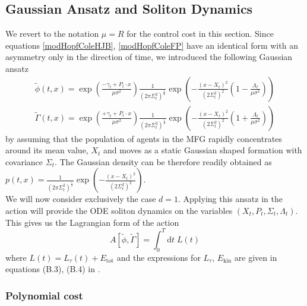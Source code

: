 \documentclass[letterpaper, 12pt]{article}
\newcommand{\rd}{{\mathrm d}}
\newcommand{\tilGamma}{\tilde{\Gamma}}
\newcommand{\tilphi}{\tilde{\phi}}
\begin{document}
\subsection{Gaussian Ansatz and Soliton Dynamics}

We revert to the notation $\mu = R$ for the control cost in this section. Since equations \eqref{modHopfColeHJB}, \eqref{modHopfColeFP} have an identical form with an asymmetry only in the direction of time, we introduced the following Gaussian ansatz \cite{Ullmo2017}
\begin{align}
\tilphi(t,x) = \exp\left( \frac{-\gamma_t + P_t \cdot x}{\mu \sigma^2} \right) \frac{1}{(2 \pi \Sigma_t^2)^\frac{1}{4}} \exp\left( -\frac{(x - X_t)^2}{(2 \Sigma_t^2)^2} (1 - \frac{\Lambda_t}{\mu \sigma^2}) \right) \\
\tilGamma(t,x) = \exp\left( \frac{+\gamma_t + P_t \cdot x}{\mu \sigma^2} \right) \frac{1}{(2 \pi \Sigma_t^2)^\frac{1}{4}} \exp\left( -\frac{(x - X_t)^2}{(2 \Sigma_t^2)^2} (1 + \frac{\Lambda_t}{\mu \sigma^2}) \right)
\end{align}
by assuming that the population of agents in the MFG rapidly concentrates around its mean value, $X_t$ and moves as a static Gaussian shaped formation with covariance $\Sigma_t$. The Gaussian density can be therefore readily obtained as $p(t,x) = \frac{1}{(2 \pi \Sigma_t^2)^\frac{1}{2}} \exp\left( -\frac{(x - X_t)^2}{(2 \Sigma_t^2)^2} \right)$. \\
\indent We will now consider exclusively the case $d = 1$. Applying this ansatz in the action will provide the ODE soliton dynamics on the variables $(X_t, P_t, \Sigma_t, \Lambda_t)$. This gives us the Lagrangian form of the action
\begin{equation}
A[\tilphi,\tilGamma] = \int_{0}^T \rd t \; L(t)
\end{equation}
where $L(t) = L_\tau(t) + E_\text{tot}$ and the expressions for $L_\tau$, $E_\text{kin}$ are given in equations (B.3), (B.4) in \cite{Ullmo2017}.

\subsubsection{Polynomial cost}
\end{document}
